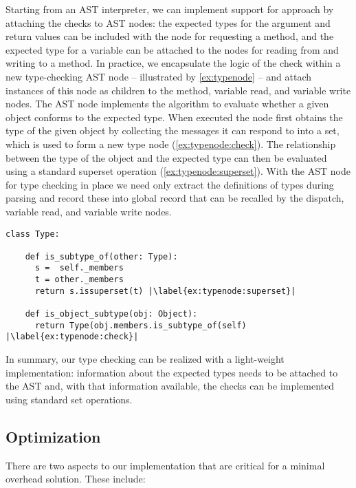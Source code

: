 Starting from an AST interpreter,
we can implement support for approach by attaching the checks to AST nodes:
the expected types for the argument and return values can be included
with the node for requesting a method, and the expected type for a variable
can be attached to the nodes for reading from and writing to a method.
In practice,
we encapsulate the logic of the check within a new type-checking AST node
-- illustrated by \cref{ex:typenode} --
and attach instances of this node as children to the method,
variable read, and variable write nodes. 
The AST node implements the algorithm to evaluate whether a given object
conforms to the expected type.
When executed the node first obtains the type of the given object by
collecting the messages it can respond to into a set,
which is used to form a new type node (\cref{ex:typenode:check}).
The relationship between the type of the object and the expected type can
then be evaluated using a standard superset operation (\cref{ex:typenode:superset}).
With the AST node for type checking in place 
we need only extract the definitions of types during parsing 
and record these into global record that can be recalled by the
dispatch, variable read, and variable write nodes.


\begin{lstlisting}[label={ex:typenode},escapechar=|,caption={An illustration of the AST node that we use to perform type checks},float,floatplacement=htbp]
class Type:

    def is_subtype_of(other: Type):
      s =  self._members
      t = other._members
      return s.issuperset(t) |\label{ex:typenode:superset}|

    def is_object_subtype(obj: Object):
      return Type(obj.members.is_subtype_of(self) |\label{ex:typenode:check}|

\end{lstlisting}


In summary, our type checking can be realized with a light-weight implementation: 
information about the expected types needs to be attached to the AST and, 
with that information available,
the checks can be implemented using standard set operations.


\subsection{Optimization}
\label{ssec:optimization}

There are two aspects to our implementation that are critical for a minimal overhead solution. These include:

